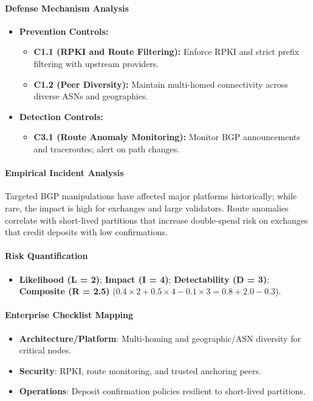 \paragraph{Defense Mechanism Analysis}
\begin{itemize}
    \item \textbf{Prevention Controls:}
    \begin{itemize}
        \item \textbf{C1.1 (RPKI and Route Filtering):} Enforce RPKI and strict prefix filtering with upstream providers.
        \item \textbf{C1.2 (Peer Diversity):} Maintain multi-homed connectivity across diverse ASNs and geographies.
    \end{itemize}
    \item \textbf{Detection Controls:}
    \begin{itemize}
        \item \textbf{C3.1 (Route Anomaly Monitoring):} Monitor BGP announcements and traceroutes; alert on path changes.
    \end{itemize}
\end{itemize}

\paragraph{Empirical Incident Analysis}
Targeted BGP manipulations have affected major platforms historically; while rare, the impact is high for exchanges and large validators. Route anomalies correlate with short-lived partitions that increase double-spend risk on exchanges that credit deposits with low confirmations.

\paragraph{Risk Quantification}
\begin{itemize}
    \item \textbf{Likelihood (L = 2)}; \textbf{Impact (I = 4)}; \textbf{Detectability (D = 3)}; \textbf{Composite (R = 2.5)} ($0.4\times2 + 0.5\times4 - 0.1\times3 = 0.8 + 2.0 - 0.3$).
\end{itemize}

\paragraph{Enterprise Checklist Mapping}
\begin{itemize}
    \item \textbf{Architecture/Platform}: Multi-homing and geographic/ASN diversity for critical nodes.
    \item \textbf{Security}: RPKI, route monitoring, and trusted anchoring peers.
    \item \textbf{Operations}: Deposit confirmation policies resilient to short-lived partitions.
\end{itemize}
